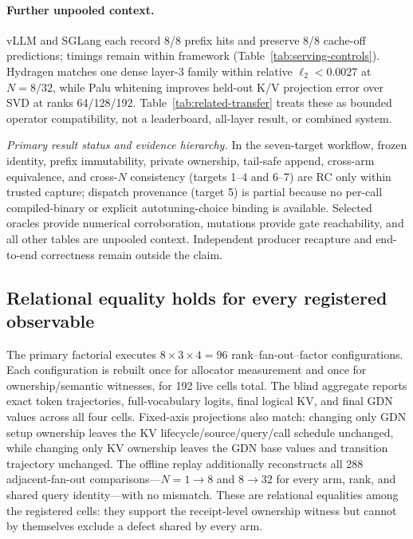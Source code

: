 \documentclass{article}
\begin{document}
\paragraph{Further unpooled context.}
vLLM and SGLang each record 8/8 prefix hits and preserve 8/8 cache-off
predictions; timings remain within framework (Table~\ref{tab:serving-controls}).
Hydragen matches one dense layer-3 family within relative $\ell_2<0.0027$ at
$N=8/32$, while Palu whitening improves held-out K/V projection error over SVD
at ranks 64/128/192.  Table~\ref{tab:related-transfer} treats these as bounded
operator compatibility, not a leaderboard, all-layer result, or combined system.

\noindent\emph{Primary result status and evidence hierarchy.} In the seven-target
workflow, frozen identity, prefix immutability, private ownership, tail-safe
append, cross-arm equivalence, and cross-$N$ consistency (targets 1--4 and
6--7) are RC only within trusted capture; dispatch provenance (target 5) is
partial because no per-call compiled-binary or explicit autotuning-choice
binding is available.  Selected oracles provide numerical corroboration,
mutations provide gate reachability, and all other tables are unpooled context.
Independent producer recapture and end-to-end correctness remain outside the
claim.

\subsection{Relational equality holds for every registered observable}

The primary factorial executes $8\times3\times4=96$ rank--fan-out--factor
configurations.  Each configuration is rebuilt once for allocator measurement
and once for ownership/semantic witnesses, for 192 live cells total.  The blind
aggregate reports exact token trajectories, full-vocabulary logits, final
logical KV, and final GDN values across all four cells.  Fixed-axis
projections also match: changing only GDN setup ownership leaves the KV
lifecycle/source/query/call schedule unchanged, while changing only KV
ownership leaves the GDN base values and transition trajectory unchanged.
The offline replay additionally reconstructs all 288 adjacent-fan-out
comparisons---$N=1\!\rightarrow\!8$ and $8\!\rightarrow\!32$ for every arm,
rank, and shared query identity---with no mismatch.
These are relational equalities among the registered cells: they support the
receipt-level ownership witness but cannot by themselves exclude a defect
shared by every arm.
\end{document}
